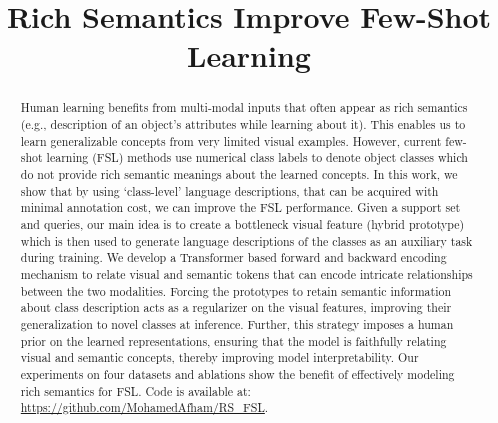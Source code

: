\documentclass{bmvc2k}
\title{Rich Semantics Improve Few-Shot Learning}
\begin{document}
\maketitle

\begin{abstract}
\noindent
Human learning benefits from multi-modal inputs that often appear as rich semantics (e.g., description of an object's attributes while learning about it). This enables us to learn generalizable concepts from very limited visual examples. However, current few-shot learning (FSL) methods use numerical class labels to denote object classes which do not provide rich semantic meanings about the learned concepts. In this work, we show that by using  `class-level' language descriptions, that can be acquired with minimal annotation cost, we can improve the FSL performance. Given a support set and queries, our main idea is to create a bottleneck visual feature (hybrid prototype) which is then used to generate language descriptions of the classes as an auxiliary task during training. We develop a Transformer based forward and backward encoding mechanism to relate visual and semantic tokens that can encode intricate relationships between the two modalities. Forcing the prototypes to retain semantic information about class description acts as a regularizer on the visual features, improving their generalization to novel classes at inference. Further, this strategy imposes a human prior on the learned representations, ensuring that the model is faithfully relating visual and semantic concepts, thereby improving model interpretability. Our experiments on four datasets and ablations show the benefit of effectively modeling rich semantics for FSL. Code is available at: {\small \url{https://github.com/MohamedAfham/RS_FSL}}.
\end{abstract}
\end{document}
